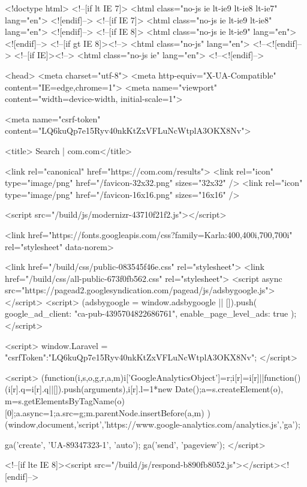 <!doctype html>
<!--[if lt IE 7]>      <html class="no-js ie lt-ie9 lt-ie8 lt-ie7" lang="en"> <![endif]-->
<!--[if IE 7]>         <html class="no-js ie lt-ie9 lt-ie8" lang="en"> <![endif]-->
<!--[if IE 8]>         <html class="no-js ie lt-ie9" lang="en"> <![endif]-->
<!--[if gt IE 8]><!--> <html class="no-js" lang="en"> <!--<![endif]-->
<!--[if IE]><!--> <html class="no-js ie" lang="en"> <!--<![endif]-->

<head>
    <meta charset="utf-8">
    <meta http-equiv="X-UA-Compatible" content="IE=edge,chrome=1">
    <meta name="viewport" content="width=device-width, initial-scale=1">

    
    <meta name="csrf-token" content="LQ6kuQp7e15Ryv40nkKtZxVFLuNcWtplA3OKX8Nv">

    <title>    Search
 | com.com</title>
    
    <link rel="canonical" href="https://com.com/results">
    <link rel="icon" type="image/png" href="/favicon-32x32.png" sizes="32x32" />
    <link rel="icon" type="image/png" href="/favicon-16x16.png" sizes="16x16" />

    
    <script src="/build/js/modernizr-43710f21f2.js"></script>

    <link href="https://fonts.googleapis.com/css?family=Karla:400,400i,700,700i" rel="stylesheet" data-norem>

        <link href="/build/css/public-083545f46e.css" rel="stylesheet">
    <link href="/build/css/all-public-673f0fb562.css" rel="stylesheet">
    <script async src="https://pagead2.googlesyndication.com/pagead/js/adsbygoogle.js"></script>
    <script>
        (adsbygoogle = window.adsbygoogle || []).push({
            google_ad_client: "ca-pub-4395704822686761",
            enable_page_level_ads: true
        });
    </script>
    
    <script>
      window.Laravel = {"csrfToken":"LQ6kuQp7e15Ryv40nkKtZxVFLuNcWtplA3OKX8Nv"};
    </script>

    <script>
        (function(i,s,o,g,r,a,m){i['GoogleAnalyticsObject']=r;i[r]=i[r]||function(){
        (i[r].q=i[r].q||[]).push(arguments)},i[r].l=1*new Date();a=s.createElement(o),
        m=s.getElementsByTagName(o)[0];a.async=1;a.src=g;m.parentNode.insertBefore(a,m)
        })(window,document,'script','https://www.google-analytics.com/analytics.js','ga');

        ga('create', 'UA-89347323-1', 'auto');
        ga('send', 'pageview');
    </script>

    
    <!--[if lte IE 8]><script src="/build/js/respond-b890fb8052.js"></script><![endif]-->

